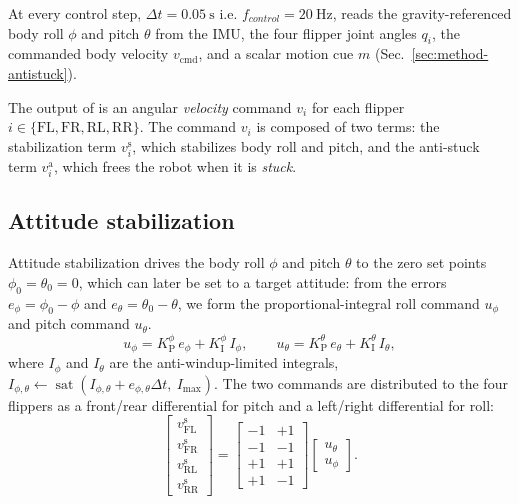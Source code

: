 At every control step, $\Delta t=\SI{0.05}{\second}$ i.e. $f_{control}=20 ~\text{Hz}$, \SAS{} reads the gravity-referenced body roll $\phi$ and pitch $\theta$ from
the IMU, the four flipper joint angles $q_i$, the commanded body velocity $v_\text{cmd}$,
and a scalar motion cue $m$ (Sec.~\ref{sec:method-antistuck}).

The output of \SAS{} is an angular \emph{velocity} command $v_i$ for each flipper
$i\in\{\mathrm{FL},\mathrm{FR},\mathrm{RL},\mathrm{RR}\}$. The command $v_i$ is composed of two terms: the
stabilization term $v^{\mathrm{s}}_i$, which stabilizes body roll and pitch, and the
anti-stuck term $v^{\mathrm{a}}_i$, which frees the robot when it is \emph{stuck}.

\subsection{Attitude stabilization}\label{sec:method-stab}
Attitude stabilization drives the body roll $\phi$ and pitch $\theta$ to the zero set points
$\phi_0=\theta_0=0$, which can later be set to a target attitude: from the errors $e_\phi=\phi_0-\phi$ and $e_\theta=\theta_0-\theta$, we form the proportional-integral roll command $u_\phi$ and
pitch command $u_\theta$.
\begin{equation}
  u_\phi = K^\phi_{\mathrm P}\,e_\phi + K^\phi_{\mathrm I}\, I_\phi, \qquad
  u_\theta = K^\theta_{\mathrm P}\,e_\theta + K^\theta_{\mathrm I}\, I_\theta,
  \label{eq:pi}
\end{equation}
where $I_\phi$ and $I_\theta$ are the anti-windup-limited integrals,
$I_{\phi,\theta}\leftarrow\operatorname{sat}(I_{\phi,\theta}+e_{\phi,\theta}\Delta t,\ I_{\max})$.
The two commands are distributed to the four flippers as a front/rear differential for
pitch and a left/right differential for roll:
\begin{equation}
  \begin{bmatrix} v^{\mathrm{s}}_{\mathrm{FL}}\\ v^{\mathrm{s}}_{\mathrm{FR}}\\ v^{\mathrm{s}}_{\mathrm{RL}}\\ v^{\mathrm{s}}_{\mathrm{RR}} \end{bmatrix}
  =
  \begin{bmatrix} -1 & +1\\ -1 & -1\\ +1 & +1\\ +1 & -1 \end{bmatrix}
  \begin{bmatrix} u_\theta\\ u_\phi \end{bmatrix}.
  \label{eq:stabmap}
\end{equation}

